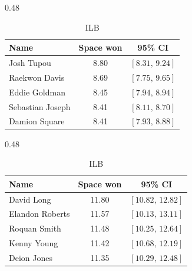 \begin{table}[h!]
\bigskip
\begin{subtable}{0.48\textwidth}
\centering
\footnotesize
\begin{tabular}{lcc}
\toprule
Name & Space won & 95\% CI \\
\midrule
Josh Tupou & 8.80 & $[8.31,\,9.24]$ \\
Raekwon Davis & 8.69 & $[7.75,\,9.65]$ \\
Eddie Goldman & 8.45 & $[7.94,\,8.94]$ \\
Sebastian Joseph & 8.41 & $[8.11,\,8.70]$ \\
Damion Square & 8.41 & $[7.93,\,8.88]$ \\
\bottomrule
\end{tabular}
\caption{NT}
\end{subtable}
\hfill
\begin{subtable}{0.48\textwidth}
\centering
\footnotesize
\begin{tabular}{lcc}
\toprule
Name & Space won & 95\% CI \\
\midrule
David Long & 11.80 & $[10.82,\,12.82]$ \\
Elandon Roberts & 11.57 & $[10.13,\,13.11]$ \\
Roquan Smith & 11.48 & $[10.25,\,12.64]$ \\
Kenny Young & 11.42 & $[10.68,\,12.19]$ \\
Deion Jones & 11.35 & $[10.29,\,12.48]$ \\
\bottomrule
\end{tabular}
\caption{ILB}
\end{subtable}

\bigskip
\end{table}

